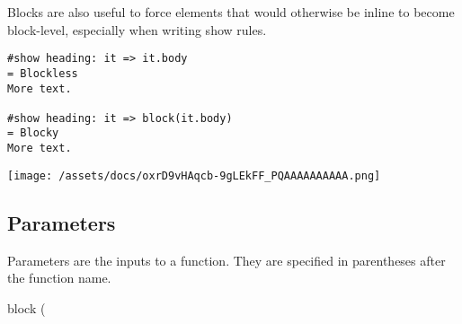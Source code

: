Blocks are also useful to force elements that would otherwise be inline
to become block-level, especially when writing show rules.

\begin{verbatim}
#show heading: it => it.body
= Blockless
More text.

#show heading: it => block(it.body)
= Blocky
More text.
\end{verbatim}

\texttt{[image: /assets/docs/oxrD9vHAqcb-9gLEkFF\_PQAAAAAAAAAA.png]}

\subsection{\texorpdfstring{{ Parameters
}}{ Parameters }}\label{parameters}

\label{parameters-tooltip}
Parameters are the inputs to a function. They are specified in
parentheses after the function name.

{ block } (

